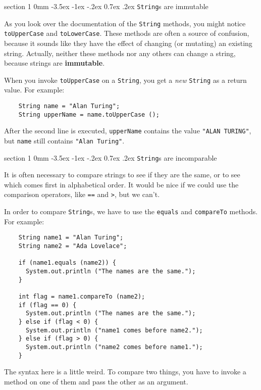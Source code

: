 \documentclass{book}
\makeatletter
\renewcommand{\section}{\@startsection 
    {section} {1} {0mm}%
    {-3.5ex \@plus -1ex \@minus -.2ex}%
    {0.7ex \@plus.2ex}%
    {\normalfont\Large\bfseries}}
\makeatother
\begin{document}


\section{{\tt String}s are immutable}
\label{immutable}

As you look over the documentation of the {\tt String} methods, you
might notice {\tt toUpperCase} and {\tt toLowerCase}.  These
methods are often a source of confusion, because it sounds
like they have the effect of changing (or mutating) an
existing string.  Actually, neither these methods nor any
others can change a string, because strings are {\bf immutable}.

When you invoke {\tt toUpperCase} on a {\tt String}, you get a
{\em new} {\tt String} as a return value.  For example:

\begin{verbatim}
    String name = "Alan Turing";
    String upperName = name.toUpperCase ();
\end{verbatim}
%
After the second line is executed, {\tt upperName} contains
the value {\tt "ALAN TURING"}, but {\tt name} still contains
{\tt "Alan Turing"}.


\section{{\tt String}s are incomparable}
\label{incomparable}

It is often necessary to compare strings to see if they are the same,
or to see which comes first in alphabetical order.  It would be
nice if we could use the comparison operators, like {\tt ==} and
{\tt >}, but we can't.

In order to compare {\tt String}s, we have to use the {\tt equals}
and {\tt compareTo} methods.  For example:

\begin{verbatim}
    String name1 = "Alan Turing";
    String name2 = "Ada Lovelace";

    if (name1.equals (name2)) {
      System.out.println ("The names are the same.");
    }

    int flag = name1.compareTo (name2);
    if (flag == 0) {
      System.out.println ("The names are the same.");
    } else if (flag < 0) {
      System.out.println ("name1 comes before name2.");
    } else if (flag > 0) {
      System.out.println ("name2 comes before name1.");
    }
\end{verbatim}
%
The syntax here is a little weird.  To compare two things, you
have to invoke a method on one of them and pass the other
as an argument.
\end{document}

